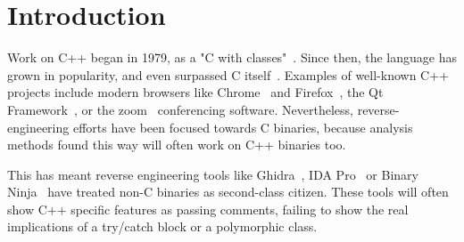 \documentclass[a4paper,11pt,oneside]{report}
\begin{document}
\maketoc

\chapter{Introduction}





Work on C++ began in 1979, as a "C with classes"~\cite{cwithclasses}.
Since then, the language has grown in popularity, and even surpassed C 
itself~\cite{stackoverflowpopularity}.
Examples of well-known C++ projects include modern browsers like 
Chrome~\cite{chrome} and Firefox~\cite{firefox}, the Qt Framework~\cite{qt}, or 
the zoom~\cite{zoom} conferencing software.
Nevertheless, reverse-engineering efforts have been focused towards C binaries, 
because analysis methods found this way will often work on C++ binaries too.



This has meant reverse engineering tools like Ghidra~\cite{ghidra}, IDA 
Pro~\cite{ida} or Binary Ninja~\cite{binja} have treated non-C binaries as 
second-class citizen.
These tools will often show C++ specific features as passing comments, failing 
to show the real implications of a try/catch block or a polymorphic class.

\end{document}
